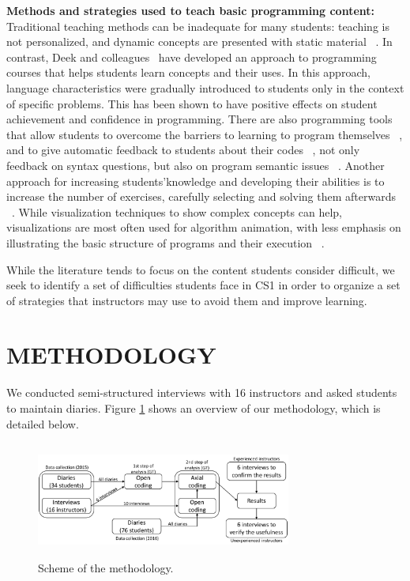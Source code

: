 \documentclass[sigconf]{acmart}
\begin{document}
\textbf{Methods and strategies used to teach basic programming content:} Traditional teaching methods can be inadequate for many students: teaching is not personalized, and dynamic concepts are presented with static material ~\cite{Gomes07}. 
In contrast, Deek and colleagues~\cite{Deek98} have developed an approach to programming courses that helps students learn concepts and their uses. In this approach, language characteristics were gradually introduced to students only in the context of specific problems. This has been shown to have positive effects on student achievement and confidence in programming. There are also programming tools that allow students to overcome the barriers to learning to program themselves ~\cite{Lee14, Ichinco17, Cao12}, and to give automatic feedback to students about their codes ~\cite{Ichinco14, Pino12}, not only feedback on syntax questions, but also on program semantic issues ~\cite{Repenning11}. Another approach for increasing students\textquoteright \space knowledge and developing their abilities is to increase the number of exercises, carefully selecting and solving them afterwards ~\cite{Mhashi13}. While visualization techniques to show complex concepts can help, visualizations are most often used for algorithm animation, with less emphasis on illustrating the basic structure of programs and their execution ~\cite{Mhashi13}.

While the literature tends to focus on the content students consider difficult, we seek to identify a set of difficulties students face in CS1 in order to organize a set of strategies that instructors may use to avoid them and improve learning.

\section{METHODOLOGY}

We conducted semi-structured interviews with 16 instructors and asked students to maintain diaries. Figure \ref{fig:Method} shows an overview of our methodology, which is detailed below.

\begin{figure}
\includegraphics[height=1.5in, width=3.3in]{Methodology}
\caption{Scheme of the methodology.}
\label{fig:Method}
\end{figure}
\end{document}
